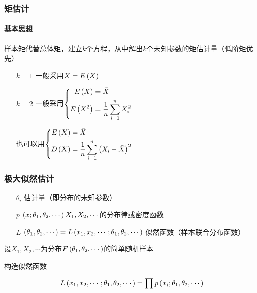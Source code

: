 \documentclass{article}
\begin{document}
\subsubsection{矩估计}

\paragraph{基本思想}

样本矩代替总体矩，建立$k$个方程，从中解出$k$个未知参数的矩估计量（低阶矩优先）

\begin{enumerate}
    \item [$k=1$] 一般采用$\bar X=E\left(X\right)$
    \item [$k=2$]
          一般采用$\left\{\begin{aligned}
                  E\left(X\right)   & =\bar X              \\
                  E\left(X^2\right) & =\frac1n\sum\limits_{i=1}^n X_i^2 \\
              \end{aligned}\right.$

          也可以用$\left\{\begin{aligned}
                  E\left(X\right) & =\bar X                          \\
                  D\left(X\right) & =\frac1n\sum\limits_{i=1}^n{\left(X_i-\bar X\right)}^2 \\
              \end{aligned}\right.$
\end{enumerate}

\subsubsection{极大似然估计}

\begin{enumerate}
    \item [$\theta_i$] 估计量（即分布的未知参数）
    \item [$p$] $\left(x;\theta_1,\theta_2,\cdots\right)X_1,X_2,\cdots$的分布律或密度函数
    \item [$L$] $\left(\theta_1,\theta_2,\cdots\right)=L\left(x_1,x_2,\cdots;\theta_1,\theta_2,\cdots\right)$ 似然函数（样本联合分布函数）
\end{enumerate}

设$X_1,X_2,\cdots$为分布$F\left(\theta_1,\theta_2,\cdots\right)$的简单随机样本

构造似然函数

\[L\left(x_1,x_2,\cdots;\theta_1,\theta_2,\cdots\right)=\prod p\left(x_i;\theta_1,\theta_2,\cdots\right)\]
\end{document}
